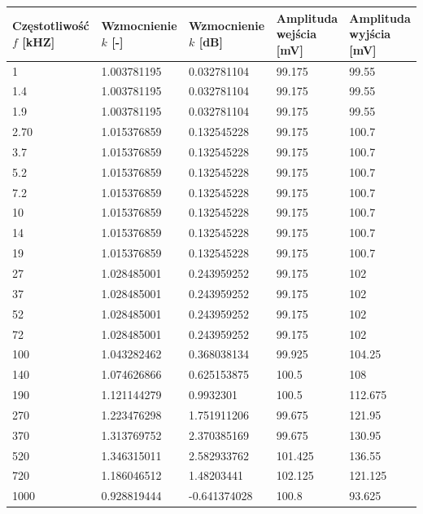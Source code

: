 \documentclass[a4paper,12pt]{article}
\begin{document}
\begin{justify}
\begin{center}
\begin{tabular}{ |p{3cm}|p{3cm}|p{3cm}|p{3cm}|p{3cm}| }
\hline
\makecell{Częstotliwość \\ $f$ [kHZ]} & \makecell{Wzmocnienie \\ $k$ [-]} & \makecell{Wzmocnienie \\ $k$ [dB]} & \makecell{Amplituda \\ wejścia [mV]} & \makecell{Amplituda \\ wyjścia [mV]} \\
\hline
1 & 1.003781195 & 0.032781104 & 99.175 & 99.55 \\
1.4 & 1.003781195 & 0.032781104 & 99.175 & 99.55 \\
1.9 & 1.003781195 & 0.032781104 & 99.175 & 99.55 \\
2.70 & 1.015376859 & 0.132545228 & 99.175 & 100.7 \\
3.7 & 1.015376859 & 0.132545228 & 99.175 & 100.7 \\
5.2 & 1.015376859 & 0.132545228 & 99.175 & 100.7 \\
7.2 & 1.015376859 & 0.132545228 & 99.175 & 100.7 \\
10 & 1.015376859 & 0.132545228 & 99.175 & 100.7 \\
14 & 1.015376859 & 0.132545228 & 99.175 & 100.7 \\
19 & 1.015376859 & 0.132545228 & 99.175 & 100.7 \\
27 & 1.028485001 & 0.243959252 & 99.175 & 102 \\
37 & 1.028485001 & 0.243959252 & 99.175 & 102 \\
52 & 1.028485001 & 0.243959252 & 99.175 & 102 \\
72 & 1.028485001 & 0.243959252 & 99.175 & 102 \\
100 & 1.043282462 & 0.368038134 & 99.925 & 104.25 \\
140 & 1.074626866 & 0.625153875 & 100.5 & 108 \\
190 & 1.121144279 & 0.9932301 & 100.5 & 112.675 \\
270 & 1.223476298 & 1.751911206 & 99.675 & 121.95 \\
370 & 1.313769752 & 2.370385169 & 99.675 & 130.95 \\
520 & 1.346315011 & 2.582933762 & 101.425 & 136.55 \\
720 & 1.186046512 & 1.48203441 & 102.125 & 121.125 \\
1000 & 0.928819444 & -0.641374028 & 100.8 & 93.625 \\

\end{tabular}
\end{center}
\end{justify}
\end{document}
